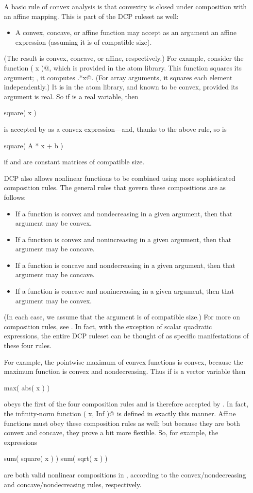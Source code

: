 \documentclass[12pt]{article}
\begin{document}
A basic rule of convex analysis is that convexity is closed under 
composition with an affine mapping. 
This is part of the DCP ruleset as well:
\begin{itemize}
\item A convex, concave, or affine function may accept as an argument
an affine expression (assuming it is of compatible size).
\end{itemize}
(The result is convex, concave, or affine, respectively.)
For example, consider the function \verb@square( x )@, which is provided
in the \cvx atom library. 
This function squares its argument; \ie, it computes
\verb@x.*x@. 
(For array arguments, it squares each element independently.)
It is in the \cvx atom library, and known to be convex, provided its
argument is real.  So if \verb@x@ is a real variable, then
\begin{code}
	square( x )
\end{code}
is accepted by \cvx as a convex expression---and, thanks to
the above rule, so is
\begin{code}
	square( A * x + b )
\end{code}
if \verb@A@ and \verb@b@ are constant matrices of compatible size.

DCP also allows nonlinear functions to be combined using more
sophisticated composition rules. The general
rules that govern these compositions are as follows:
\begin{itemize}
\item If a function is convex and nondecreasing in a given argument,
then that argument may be convex.
\item If a function is convex and nonincreasing in a given argument,
then that argument may be concave.
\item If a function is concave and nondecreasing in a given argument,
then that argument may be concave.
\item If a function is concave and nonincreasing in a given argument,
then that argument may be convex.
\end{itemize}
(In each case, we assume that the argument is of compatible size.)
For more on composition rules, see \cite[\S3.2.4]{BV:04}.
In fact, with the exception of scalar quadratic expressions,
the entire DCP ruleset can be thought of as specific manifestations
of these four rules.

For example, the pointwise maximum of convex functions is convex, because
the maximum function is convex and nondecreasing.
Thus if \verb@x@ is a vector variable then 
\begin{code}
	max( abs( x ) )
\end{code}
obeys the first of the four composition rules and is therefore accepted
by \cvx. In fact, the infinity-norm function \verb@norm( x, Inf )@
is defined in exactly this manner. 
Affine functions must obey these composition rules as well; but because they
are both convex and concave, they prove a bit more flexible. So, for example, 
the expressions
\begin{code}
	sum( square( x ) )
	sum( sqrt( x ) )
\end{code}
are both valid nonlinear compositions in \cvx, according to the 
convex/nondecreasing and concave/nondecreasing rules, respectively.
\end{document}
